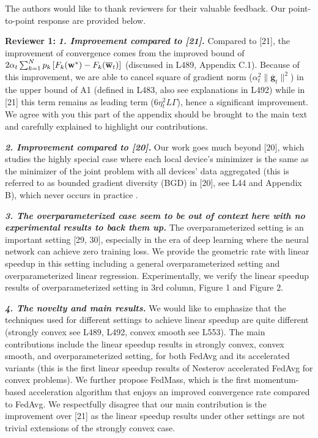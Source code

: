 \documentclass{article}
\newcommand{\ov}[1]{{\overline{\mathbf{#1}}}}
\begin{document}
The authors would like to thank reviewers for their valuable feedback. 
Our point-to-point response are provided below.

% 
\vspace{-1.5mm}
{\color{blue}\textbf{Reviewer 1:}} 
\vspace{-0.4mm}
\textbf{\textit{1. Improvement compared to [21].}} Compared to [21], the improvement 
of convergence comes from the improved bound of {\small $2\alpha_{t}\sum_{k=1}^{N}p_{k}\left[F_{k}(\vw^{\ast})-F_{k}(\ov{w}_{t})\right]$} (discussed in L489, Appendix C.1). Because of this improvement, we are able to cancel square of gradient norm ($\alpha_{t}^{2}\|\ov{g}_{t}\|^{2}$) in the upper bound of A1 (defined in L483, also see explanations in L492) while in [21] this term remains as leading term ($6\eta_t^2L \Gamma$), hence a significant improvement. We agree with you this part of the appendix should be brought to the main text and carefully explained to highlight our contributions.  
\vspace{-1.5mm}

\textbf{\textit{2. Improvement compared to [20].}}
Our work goes much beyond [20], which studies the highly special case where each local device’s minimizer is the same as the minimizer of the joint problem with all devices' data aggregated (this is referred to as bounded gradient diversity (BGD) in [20], see L44 and Appendix B), which never occurs in practice . 
\vspace{-1.5mm}


\textbf{\textit{3. The overparameterized case seem to be out of context here with no experimental results to back them up.}} The overparameterized 
setting is an important setting [29, 30], especially in the era of deep learning
where the neural network can achieve zero training loss. We provide the 
geometric rate with linear speedup in this setting including a general overparameterized setting and overparameterized linear regression. 
Experimentally, we verify the linear speedup results of overparameterized setting in 3rd column, Figure 1 and Figure 2. 
\vspace{-1.5mm}

\textbf{\textit{4. The novelty and main results.}}
We would like to emphasize that the techniques used for different settings
to achieve linear speedup are quite different (strongly convex see L489, L492, convex smooth see L553). The main contributions include
the linear speedup results in strongly convex, convex smooth, and overparameterized
setting, for both FedAvg and its accelerated variants (this is the first linear speedup results of Nesterov accelerated FedAvg for convex problems). We further propose FedMass,
which is the first momentum-based acceleration algorithm that enjoys an improved convergence rate compared to
FedAvg. We respectfully disagree that our main contribution is the improvement over [21] as the linear speedup results under other settings are not trivial extensions of the strongly convex case.
\vspace{-1.5mm}
\end{document}
